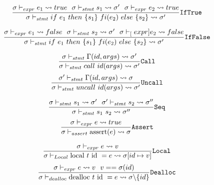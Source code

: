 \begin{equation} \label{eq:IfTrue}
    \frac{\sigma \vdash_{expr} e_1 \leadsto true ~~
        \sigma \vdash_{stmt} s_1 \leadsto \sigma' ~~
        \sigma \vdash_{expr} e_2 \leadsto true}
    {\sigma \vdash_{stmt} if~e_1~then~\{s_1\}~fi(e_2)~else~\{s_2\} \leadsto \sigma'}
    \text{\texttt{IfTrue}}
\end{equation}

\begin{equation} \label{eq:IfFalse}
    \frac{\sigma \vdash_{expr} e_1 \leadsto false ~~
        \sigma \vdash_{stmt} s_2 \leadsto \sigma' ~~
        \sigma \vdash_[expr] e_2 \leadsto false}
    {\sigma \vdash_{stmt} if~e_1~then~\{s_1\}~fi(e_2)~else~\{s_2\} \leadsto \sigma'}
    \text{\texttt{IfFalse}}
\end{equation}

\begin{multicols}{2}
    \begin{equation} \label{eq:Call}
        \frac{\sigma \vdash_{stmt} \Gamma(id, args) \leadsto \sigma'}
        {\sigma \vdash_{stmt} call~id(args) \leadsto \sigma'}
        \text{\texttt{Call}}
    \end{equation}
    \break
    \begin{equation} \label{eq:Uncall}
        \frac{\sigma' \vdash_{stmt} \Gamma(id, args) \leadsto \sigma}
        {\sigma \vdash_{stmt} uncall~id(args) \leadsto \sigma'}
        \text{\texttt{Uncall}}
    \end{equation}
\end{multicols}

\begin{multicols}{2}
    \begin{equation} \label{eq:Seq}
        \frac{\sigma \vdash_{stmt} s_1 \leadsto \sigma' ~~
            \sigma' \vdash_{stmt} s_2 \leadsto \sigma''}
        {\sigma \vdash_{stmt} s_1~s_2 \leadsto \sigma''}
        \text{\texttt{Seq}}
    \end{equation}
    \break
    \begin{equation} \label{eq:assert}
        \frac{\sigma \vdash_{expr} e \leadsto true}
        {\sigma \vdash_{assert} \text{assert}(e) \leadsto \sigma}
        \text{\texttt{Assert}}
    \end{equation}
\end{multicols}

\begin{multicols}{2}
    \begin{equation} \label{eq:local}
        \frac{\sigma \vdash_{expr} e \leadsto v}
        {\sigma \vdash_{Local} \text{local } t \text{ id } = e \leadsto \sigma[id \mapsto v]}
        \text{\texttt{Local}}
    \end{equation}
    \break
    \begin{equation} \label{eq:dealloc}
        \frac{\sigma \vdash_{expr} e \leadsto v ~~
            v == \sigma(id)}
        {\sigma \vdash_{dealloc} \text{dealloc } t \text{ id } = e \leadsto \sigma\backslash \{id\}}
        \text{\texttt{Dealloc}}
    \end{equation}
\end{multicols}

